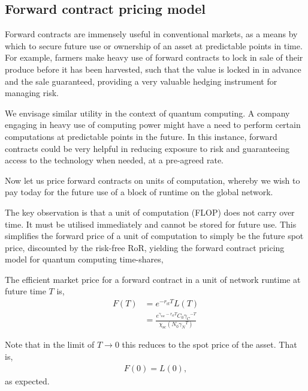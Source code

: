%
%

\subsection{Forward contract pricing model}\label{sec:for_contr}

Forward contracts are immensely useful in conventional markets, as a means by which to secure future use or ownership of an asset at predictable points in time. For example, farmers make heavy use of forward contracts to lock in sale of their produce before it has been harvested, such that the value is locked in in advance and the sale guaranteed, providing a very valuable hedging instrument for managing risk.

We envisage similar utility in the context of quantum computing. A company engaging in heavy use of computing power might have a need to perform certain computations at predictable points in the future. In this instance, forward contracts could be very helpful in reducing exposure to risk and guaranteeing access to the technology when needed, at a pre-agreed rate.

Now let us price forward contracts on units of computation, whereby we wish to pay today for the future use of a block of runtime on the global network.

The key observation is that a unit of computation (FLOP) does not carry over time. It must be utilised immediately and cannot be stored for future use. This simplifies the forward price of a unit of computation to simply be the future spot price, discounted by the risk-free RoR, yielding the forward contract pricing model for quantum computing time-shares,
\begin{definition} \label{def:forward_cont}
The efficient market price for a forward contract in a unit of network runtime at future time $T$ is,
\begin{align}
F(T) &= e^{-r_\text{rf}T} L(T)\nonumber\\
&=\frac{e^{\gamma_\text{ror}-r_\text{rf}T} C_0{\gamma_C}^{-T}}{\chi_\text{sc}(N_0 {\gamma_N}^T)}
\end{align}
\end{definition}

Note that in the limit of \mbox{$T\to 0$} this reduces to the spot price of the asset. That is,
\begin{align}
	F(0)=L(0),
\end{align}
as expected.

